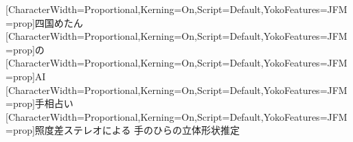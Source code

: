 \documentclass{standalone}
\begin{document}
	{[CharacterWidth=Proportional,Kerning=On,Script=Default,YokoFeatures={JFM=prop}]四国めたん}
	{[CharacterWidth=Proportional,Kerning=On,Script=Default,YokoFeatures={JFM=prop}]の}
	{[CharacterWidth=Proportional,Kerning=On,Script=Default,YokoFeatures={JFM=prop}]AI}
	{[CharacterWidth=Proportional,Kerning=On,Script=Default,YokoFeatures={JFM=prop}]手相占い}
	{[CharacterWidth=Proportional,Kerning=On,Script=Default,YokoFeatures={JFM=prop}]照度差ステレオによる 手のひらの立体形状推定}
\end{document}
